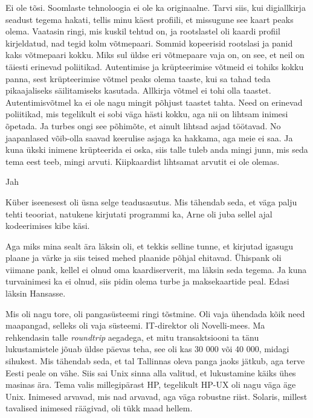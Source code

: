 Ei ole tõsi. Soomlaste tehnoloogia ei ole ka originaalne. Tarvi siis, kui  
digiallkirja seadust tegema hakati, tellis minu käest profiili, et missugune 
see kaart peaks olema. Vaatasin ringi, mis kuskil tehtud on, ja rootslastel oli 
kaardi profiil kirjeldatud, nad tegid kolm võtmepaari. Sommid kopeerisid 
rootslasi ja panid kaks võtmepaari kokku. Miks sul üldse eri võtmepaare vaja 
on, on see, et neil on täiesti erinevad poliitikad. Autentimise ja 
krüpteerimise võtmeid ei tohiks kokku panna, sest krüpteerimise võtmel  peaks 
olema taaste, kui sa tahad teda pikaajaliseks säilitamiseks kasutada. Allkirja 
võtmel ei tohi olla taastet. 
Autentimisvõtmel ka ei ole nagu mingit põhjust taastet tahta. Need on erinevad 
poliitikad, mis tegelikult ei sobi väga hästi kokku, aga nii on lihtsam inimesi 
õpetada. Ja turbes ongi see põhimõte, et ainult lihtsad asjad töötavad. No 
jaapanlased võib-olla saavad keerulise asjaga ka hakkama, aga meie ei saa. Ja 
kuna ükski inimene krüpteerida ei oska, siis talle tuleb anda mingi junn, mis 
seda tema eest teeb, mingi arvuti. Kiipkaardist lihtsamat arvutit ei ole olemas.
     

Jah

            
Küber iseenesest oli üsna selge teadusasutus. Mis tähendab seda, et väga palju 
tehti teooriat, natukene kirjutati programmi ka, Arne oli juba sellel ajal kodeerimises kibe käsi.

Aga miks mina sealt ära läksin oli, et tekkis selline tunne, et kirjutad 
igasugu plaane ja värke ja siis teised mehed plaanide põhjal ehitavad. 
Ühispank oli viimane pank, kellel ei olnud oma 
kaardiserverit, ma läksin seda 
tegema. Ja kuna turvainimesi ka ei olnud, siis pidin olema turbe ja 
maksekaartide peal. Edasi läksin Hansasse. 

Mis oli nagu tore, oli pangasüsteemi ringi tõstmine. Oli vaja ühendada kõik 
need maapangad, selleks oli vaja süsteemi. 
IT-direktor oli 
Novelli-mees. Ma rehkendasin talle \emph{roundtrip} aegadega, et mitu 
transaktsiooni ta tänu lukustamistele jõuab üldse päevas teha, see oli kas 30 
000 või 40 000, midagi sihukest. Mis tähendab seda, et tal Tallinnas oleva 
panga jaoks jätkub, aga terve Eesti peale on vähe. Siis sai Unix sinna alla 
valitud, et lukustamine käiks ühes masinas ära. Tema valis millegipärast HP, 
tegelikult HP-UX oli nagu väga äge Unix. Inimesed arvavad, mis 
nad arvavad, aga väga robustne riist. Solaris, millest tavalised inimesed 
räägivad, oli tükk maad hellem. 

